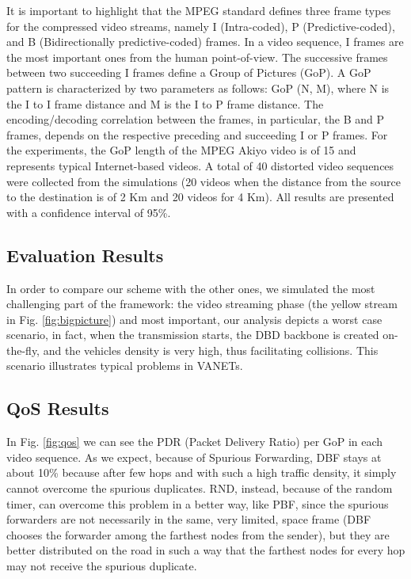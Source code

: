 \documentclass{acm_proc_article-sp}
\begin{document}
It is important to highlight that the MPEG standard defines three frame types for the compressed video streams, namely I (Intra-coded), P (Predictive-coded), and B (Bidirectionally predictive-coded) frames. In a video sequence, I frames are the most important ones from the human point-of-view. The successive frames between two succeeding I frames define a Group of Pictures (GoP). A GoP pattern is characterized by two parameters as follows: GoP (N, M), where N is the I to I frame distance and M is the I to P frame distance. The encoding/decoding correlation between the frames, in particular, the B and P frames, depends on the respective preceding and succeeding I or P frames. For the experiments, the GoP length of the MPEG Akiyo video is of 15 and represents typical Internet-based videos. A total of 40 distorted video sequences were collected from the simulations (20 videos when the distance from the source to the destination is of 2 Km and 20 videos for 4 Km). All results are presented with a confidence interval of 95\%.




\subsection{Evaluation Results}
\label{Evaluation Results}
In order to compare our scheme with the other ones, we simulated the most challenging part of the framework: the video streaming phase (the yellow stream in Fig. \ref{fig:bigpicture}) and most important, our analysis depicts a worst case scenario, in fact, when the transmission starts, the DBD backbone is created on-the-fly, and the vehicles density is very high, thus facilitating collisions. This scenario illustrates typical problems in VANETs.




\subsection{QoS Results}
\label{QoSResults}

In Fig. \ref{fig:qos} we can see the PDR (Packet Delivery Ratio) per GoP in each video sequence. As we expect, because of Spurious Forwarding, DBF stays at about 10\% because after few hops and with such a high traffic density, it simply cannot overcome the spurious duplicates. RND, instead, because of the random timer, can overcome this problem in a better way, like PBF, since the spurious forwarders are not necessarily in the same, very limited, space frame (DBF chooses the forwarder among the farthest nodes from the sender), but they are better distributed on the road in such a way that the farthest nodes for every hop may not receive the spurious duplicate.
\end{document}
